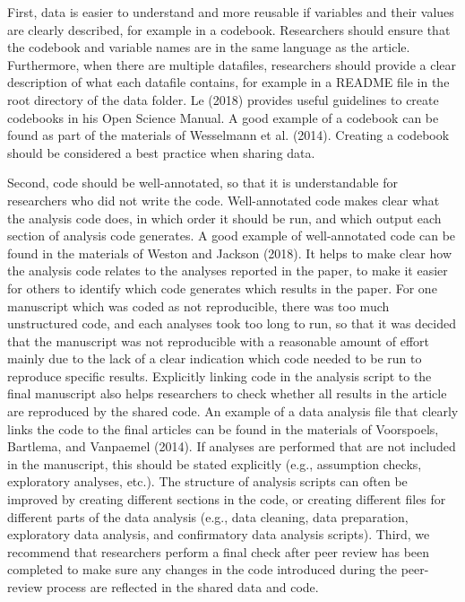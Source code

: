 \documentclass[,jou, a4paper,floatsintext]{apa6}
\begin{document}
First, data is easier to understand and more reusable if variables and their values are clearly described, for example in a codebook. Researchers should ensure that the codebook and variable names are in the same language as the article. Furthermore, when there are multiple datafiles, researchers should provide a clear description of what each datafile contains, for example in a README file in the root directory of the data folder. Le (2018) provides useful guidelines to create codebooks in his Open Science Manual. A good example of a codebook can be found as part of the materials of Wesselmann et al. (2014). Creating a codebook should be considered a best practice when sharing data.

Second, code should be well-annotated, so that it is understandable for researchers who did not write the code. Well-annotated code makes clear what the analysis code does, in which order it should be run, and which output each section of analysis code generates. A good example of well-annotated code can be found in the materials of Weston and Jackson (2018). It helps to make clear how the analysis code relates to the analyses reported in the paper, to make it easier for others to identify which code generates which results in the paper. For one manuscript which was coded as not reproducible, there was too much unstructured code, and each analyses took too long to run, so that it was decided that the manuscript was not reproducible with a reasonable amount of effort mainly due to the lack of a clear indication which code needed to be run to reproduce specific results. Explicitly linking code in the analysis script to the final manuscript also helps researchers to check whether all results in the article are reproduced by the shared code. An example of a data analysis file that clearly links the code to the final articles can be found in the materials of Voorspoels, Bartlema, and Vanpaemel (2014). If analyses are performed that are not included in the manuscript, this should be stated explicitly (e.g., assumption checks, exploratory analyses, etc.). The structure of analysis scripts can often be improved by creating different sections in the code, or creating different files for different parts of the data analysis (e.g., data cleaning, data preparation, exploratory data analysis, and confirmatory data analysis scripts). Third, we recommend that researchers perform a final check after peer review has been completed to make sure any changes in the code introduced during the peer-review process are reflected in the shared data and code.
\end{document}
